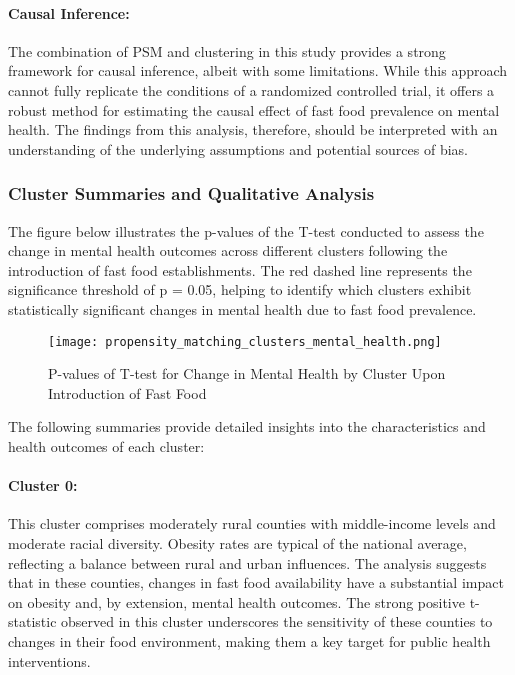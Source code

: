 \documentclass[letterpaper, 11pt]{report}
\begin{document}
\paragraph{Causal Inference:}
The combination of PSM and clustering in this study provides a strong framework for causal inference, albeit with some limitations. While this approach cannot fully replicate the conditions of a randomized controlled trial, it offers a robust method for estimating the causal effect of fast food prevalence on mental health. The findings from this analysis, therefore, should be interpreted with an understanding of the underlying assumptions and potential sources of bias.

\subsubsection{Cluster Summaries and Qualitative Analysis}

\noindent The figure below illustrates the p-values of the T-test conducted to assess the change in mental health outcomes across different clusters following the introduction of fast food establishments. The red dashed line represents the significance threshold of p = 0.05, helping to identify which clusters exhibit statistically significant changes in mental health due to fast food prevalence.

\begin{figure}[h!]
    \centering
    \texttt{[image: propensity\_matching\_clusters\_mental\_health.png]}
    \caption{P-values of T-test for Change in Mental Health by Cluster Upon Introduction of Fast Food}
    \label{fig:mental_health_pvalues}
\end{figure}





The following summaries provide detailed insights into the characteristics and health outcomes of each cluster:

\paragraph{Cluster 0:} 
This cluster comprises moderately rural counties with middle-income levels and moderate racial diversity. Obesity rates are typical of the national average, reflecting a balance between rural and urban influences. The analysis suggests that in these counties, changes in fast food availability have a substantial impact on obesity and, by extension, mental health outcomes. The strong positive t-statistic observed in this cluster underscores the sensitivity of these counties to changes in their food environment, making them a key target for public health interventions. 
\end{document}
